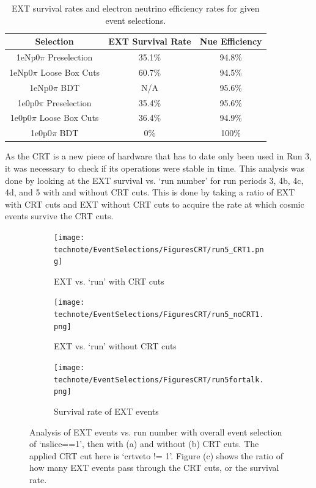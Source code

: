 \begin{table} [h!]
    \centering
    \begin{tabular}{| c | c | c |}
         \hline
         \textbf{Selection} & \textbf{EXT Survival Rate} & \textbf{Nue Efficiency} \\  [0.75ex]
         \hline
         1eNp0$\pi$ Preselection & 35.1\% & 94.8\% \\ 
         \hline
         1eNp0$\pi$ Loose Box Cuts & 60.7\% & 94.5\% \\ 
         \hline
         1eNp0$\pi$ BDT & N/A & 95.6\% \\ 
         \hline
         1e0p0$\pi$ Preselection & 35.4\% & 95.6\% \\ 
         \hline
         1e0p0$\pi$ Loose Box Cuts & 36.4\% & 94.9\% \\ 
         \hline
         1e0p0$\pi$ BDT & 0\% & 100\% \\ 
         \hline 
    \end{tabular}
    \caption{EXT survival rates and electron neutrino efficiency rates for given event selections.}
    \label{tab:EXT_survival_table}
\end{table}

As the CRT is a new piece of hardware that has to date only been used in Run 3, it was necessary to check if its operations were stable in time. This analysis was done by looking at the EXT survival vs. `run number' for run periods 3, 4b, 4c, 4d, and 5 with and without CRT cuts. This is done by taking a ratio of EXT with CRT cuts and EXT without CRT cuts to acquire the rate at which cosmic events survive the CRT cuts. 

\begin{figure}[H]
 \centering
    \begin{subfigure}[t]{0.31\linewidth}
        \texttt{[image: technote/EventSelections/FiguresCRT/run5\_CRT1.png]}
        \caption{EXT vs. `run' with CRT cuts}
    \end{subfigure}%
    \hspace{0.3cm}%
    \begin{subfigure}[t]{0.31\linewidth}
        \texttt{[image: technote/EventSelections/FiguresCRT/run5\_noCRT1.png]}%
        \caption{EXT vs. `run' without CRT cuts}
    \end{subfigure}%
    \hspace{0.3cm}%
    \begin{subfigure}[t]{0.32\linewidth}
        \texttt{[image: technote/EventSelections/FiguresCRT/run5fortalk.png]}%
        \caption{Survival rate of EXT events}
    \end{subfigure}
    \caption{Analysis of EXT events vs. run number with overall event selection of `nslice==1', then with (a) and without (b) CRT cuts. The applied CRT cut here is `crtveto != 1'. Figure (c) shows the ratio of how many EXT events pass through the CRT cuts, or the survival rate. }
    \label{fig:EXT_survival_run5}
\end{figure}

